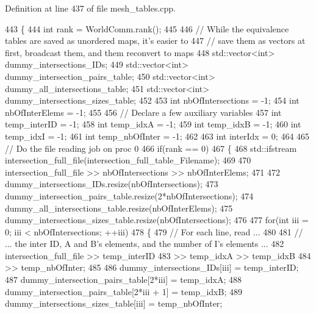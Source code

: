 Definition at line 437 of file mesh\+\_\+tables.\+cpp.


\begin{DoxyCode}
443 \{
444     \textcolor{keywordtype}{int} rank = WorldComm.rank();
445 
446     \textcolor{comment}{//  While the equivalence tables are saved as unordered maps, it's easier to}
447     \textcolor{comment}{// save them as vectors at first, broadcast them, and them reconvert to maps}
448     std::vector<int> dummy\_intersections\_IDs;
449     std::vector<int> dummy\_intersection\_pairs\_table;
450     std::vector<int> dummy\_all\_intersections\_table;
451     std::vector<int> dummy\_intersections\_sizes\_table;
452 
453     \textcolor{keywordtype}{int} nbOfIntersections = -1;
454     \textcolor{keywordtype}{int} nbOfInterElems = -1;
455 
456     \textcolor{comment}{// Declare a few auxiliary variables}
457     \textcolor{keywordtype}{int} temp\_interID = -1;
458     \textcolor{keywordtype}{int} temp\_idxA = -1;
459     \textcolor{keywordtype}{int} temp\_idxB = -1;
460     \textcolor{keywordtype}{int} temp\_idxI = -1;
461     \textcolor{keywordtype}{int} temp\_nbOfInter = -1;
462 
463     \textcolor{keywordtype}{int} interIdx = 0;
464 
465     \textcolor{comment}{// Do the file reading job on proc 0}
466     \textcolor{keywordflow}{if}(rank == 0)
467     \{
468         std::ifstream intersection\_full\_file(intersection\_full\_table\_Filename);
469 
470         intersection\_full\_file >> nbOfIntersections >> nbOfInterElems;
471 
472         dummy\_intersections\_IDs.resize(nbOfIntersections);
473         dummy\_intersection\_pairs\_table.resize(2*nbOfIntersections);
474         dummy\_all\_intersections\_table.resize(nbOfInterElems);
475         dummy\_intersections\_sizes\_table.resize(nbOfIntersections);
476 
477         \textcolor{keywordflow}{for}(\textcolor{keywordtype}{int} iii = 0; iii < nbOfIntersections; ++iii)
478         \{
479             \textcolor{comment}{// For each line, read ...}
480 
481             \textcolor{comment}{// ... the inter ID, A and B's elements, and the number of I's elements ...}
482             intersection\_full\_file  >> temp\_interID
483                                     >> temp\_idxA >> temp\_idxB
484                                     >> temp\_nbOfInter;
485 
486             dummy\_intersections\_IDs[iii]              = temp\_interID;
487             dummy\_intersection\_pairs\_table[2*iii]     = temp\_idxA;
488             dummy\_intersection\_pairs\_table[2*iii + 1] = temp\_idxB;
489             dummy\_intersections\_sizes\_table[iii]      = temp\_nbOfInter;

\end{DoxyCode}

